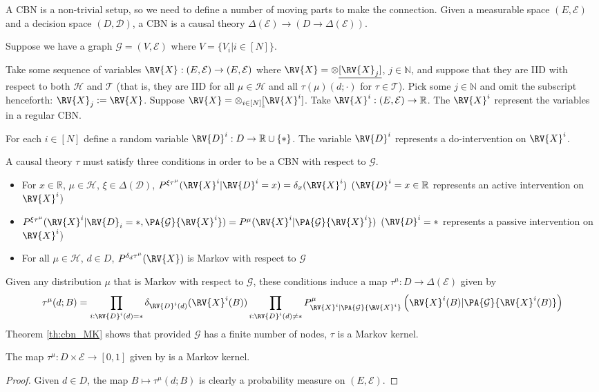 \label{app:cbn_ct}

A CBN is a non-trivial setup, so we need to define a number of moving parts to make the connection. Given a measurable space $(E,\mathcal{E})$ and a decision space $(D,\mathcal{D})$, a CBN is a causal theory $\Delta(\mathcal{E})\to (D\to \Delta(\mathcal{E}))$.

Suppose we have a graph $\mathcal{G}=(V,\mathscr{E})$ where $V=\{V_i|i\in [N]\}$.

Take some sequence of variables $\RV{X}:(E,\mathcal{E})\to (E,\mathcal{E})$ where $\RV{X} = \otimes\underline{[\RV{X}_j]}$, $j\in \mathbb{N}$, and suppose that they are IID with respect to both $\mathscr{H}$ and $\mathscr{T}$ (that is, they are IID for all $\mu\in\mathscr{H}$ and all  $\tau(\mu)(d;\cdot)$ for $\tau \in \mathscr{T}$). Pick some $j\in \mathbb{N}$ and omit the subscript henceforth: $\RV{X}_j:=\RV{X}$. Suppose $\RV{X} = \otimes_{i\in[N]}\underline[\RV{X}^i]$. Take $\RV{X}^i:(E,\mathcal{E})\to \mathbb{R}$. The $\RV{X}^i$ represent the variables in a regular CBN.

For each $i\in [N]$ define a random variable $\RV{D}^i:D\to \mathbb{R}\cup\{*\}$. The variable $\RV{D}^i$ represents a do-intervention on $\RV{X}^i$.

A causal theory $\tau$ must satisfy three conditions in order to be a CBN with respect to $\mathcal{G}$.

\begin{itemize}
    \item For $x\in \mathbb{R}$, $\mu\in \mathscr{H}$, $\xi\in \Delta(\mathcal{D})$,  $P^{\xi \tau^\mu}(\RV{X}^i|\RV{D}^i=x)=\delta_x(\RV{X}^i)$ ($\RV{D}^i=x\in \mathbb{R}$ represents an active intervention on $\RV{X}^i$)
    \item $P^{\xi \tau^\mu}(\RV{X}^i|\RV{D}_i=*,\PA{\mathcal{G}}{\RV{X}^i}) = P^\mu(\RV{X}^i|\PA{\mathcal{G}}{\RV{X}^i})$ ($\RV{D}^i=*$ represents a passive intervention on $\RV{X}^i$)
    \item For all $\mu\in \mathscr{H}$, $d\in D$, $P^{\delta_d \tau^\mu}(\RV{X})$ is Markov with respect to $\mathcal{G}$
\end{itemize}

Given any distribution $\mu$ that is Markov with respect to $\mathcal{G}$, these conditions induce a map $\tau^\mu:D\to \Delta(\mathcal{E})$ given by\cite{pearl_causality:_2009}
\begin{align}
    \tau^\mu(d;B) = \prod_{i:\RV{D}^i(d)=*} \delta_{\RV{D}^i(d)} (\RV{X}^i(B)) \prod_{i:\RV{D}^i(d)\neq *} P^{\mu}_{\RV{X}^i|\PA{\mathcal{G}}{\RV{X}^i}} \left(\RV{X}^i(B)|\PA{\mathcal{G}}{\RV{X}^i(B)}\right)
\end{align}
Theorem \ref{th:cbn_MK} shows that provided $\mathcal{G}$ has a finite number of nodes, $\tau$ is a Markov kernel.

\begin{theorem}\label{th:cbn_MK}
The map $\tau^\mu:D\times \mathcal{E}\to [0,1]$ given by  is a Markov kernel.
\end{theorem}

\begin{proof}
Given $d\in D$, the map $B\mapsto \tau^\mu(d;B)$ is clearly a probability measure on $(E,\mathcal{E})$.

 
\end{proof}


